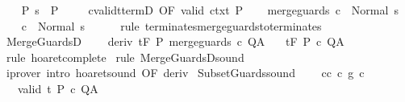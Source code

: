 \begin{isabellebody}
\ \ \isamarkupfalse%
\ P{\isacharcolon}\ {\isachardoublequoteopen}s\ {\isasymin}\ P{\isachardoublequoteclose}\ \isanewline
\ \ \isamarkupfalse%
\ cvalidt{\isacharunderscore}termD\ {\isacharbrackleft}OF\ valid\ ctxt\ P{\isacharbrackright}\isanewline
\ \ \isamarkupfalse%
\ {\isachardoublequoteopen}{\isasymGamma}{\isasymturnstile}merge{\isacharunderscore}guards\ c\ {\isasymdown}\ Normal\ s{\isachardoublequoteclose}\isacommand{{\isachardot}}\isamarkupfalse%
\isanewline
\ \ \isamarkupfalse%
\ {\isachardoublequoteopen}{\isasymGamma}{\isasymturnstile}c\ {\isasymdown}\ Normal\ s{\isachardoublequoteclose}\isanewline
\ \ \ \ \isamarkupfalse%
\ {\isacharparenleft}rule\ terminates{\isacharunderscore}merge{\isacharunderscore}guards{\isacharunderscore}to{\isacharunderscore}terminates{\isacharparenright}\isanewline
{}\isamarkupfalse%
%
\endisatagproof
{\isafoldproof}%
%
\isadelimproof
\isanewline
%
\endisadelimproof
\isanewline
{}\isamarkupfalse%
\ MergeGuardsD{\isacharcolon}\ \isanewline
\ \ \ deriv{\isacharcolon}\ {\isachardoublequoteopen}{\isasymGamma}{\isacharcomma}{\isasymTheta}{\isasymturnstile}\isactrlsub t\isactrlbsub {\isacharslash}F\isactrlesub \ P\ merge{\isacharunderscore}guards\ c\ Q{\isacharcomma}A{\isachardoublequoteclose}\isanewline
\ \ \ {\isachardoublequoteopen}{\isasymGamma}{\isacharcomma}{\isasymTheta}{\isasymturnstile}\isactrlsub t\isactrlbsub {\isacharslash}F\isactrlesub \ P\ c\ Q{\isacharcomma}A{\isachardoublequoteclose}\isanewline
%
\isadelimproof
%
\endisadelimproof
%
\isatagproof
{}\isamarkupfalse%
\ {\isacharparenleft}rule\ hoaret{\isacharunderscore}complete{\isacharprime}{\isacharparenright}\isanewline
{}\isamarkupfalse%
\ {\isacharparenleft}rule\ MergeGuardsD{\isacharunderscore}sound{\isacharparenright}\isanewline
{}\isamarkupfalse%
\ {\isacharparenleft}iprover\ intro{\isacharcolon}\ hoaret{\isacharunderscore}sound\ {\isacharbrackleft}OF\ deriv{\isacharbrackright}{\isacharparenright}\isanewline
{}\isamarkupfalse%
%
\endisatagproof
{\isafoldproof}%
%
\isadelimproof
\isanewline
%
\endisadelimproof
\isanewline
\isanewline
{}\isamarkupfalse%
\ SubsetGuards{\isacharunderscore}sound{\isacharcolon}\ \isanewline
\ \ \ c{\isacharunderscore}c{\isacharprime}{\isacharcolon}\ {\isachardoublequoteopen}c\ {\isasymsubseteq}\isactrlsub g\ c{\isacharprime}{\isachardoublequoteclose}\isanewline
\ \ \ valid{\isacharcolon}\ {\isachardoublequoteopen}{\isasymGamma}{\isacharcomma}{\isasymTheta}{\isasymTurnstile}\isactrlsub t\isactrlbsub {\isacharslash}{\isacharbraceleft}{\isacharbraceright}\isactrlesub \ P\ c{\isacharprime}\ Q{\isacharcomma}A{\isachardoublequoteclose}\isanewline

\end{isabellebody}
